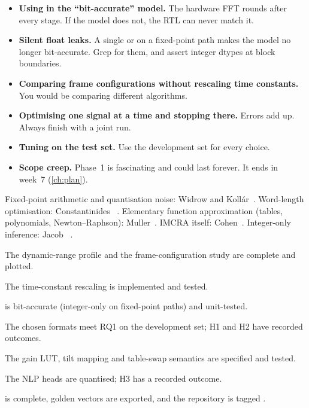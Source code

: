 \begin{pitfallbox}
\begin{itemize}
  \item \textbf{Using  in the \enquote{bit-accurate} model.} The
        hardware FFT rounds after every stage. If the model does not, the RTL
        can never match it.
  \item \textbf{Silent float leaks.} A single  or \code{/} on a
        fixed-point path makes the model no longer bit-accurate. Grep for them,
        and assert integer dtypes at block boundaries.
  \item \textbf{Comparing frame configurations without rescaling time
        constants.} You would be comparing different algorithms.
  \item \textbf{Optimising one signal at a time and stopping there.} Errors add
        up. Always finish with a joint run.
  \item \textbf{Tuning on the test set.} Use the development set for every
        choice.
  \item \textbf{Scope creep.} Phase~1 is fascinating and could last forever.
        It ends in week~7 (\cref{ch:plan}).
\end{itemize}
\end{pitfallbox}

\begin{readbox}
Fixed-point arithmetic and quantisation noise:
Widrow and Koll\'ar~\cite{widrow2008quantization}. Word-length optimisation:
Constantinides \etal~\cite{ch12-13:constantinides2003wordlength}. Elementary
function approximation (tables, polynomials, Newton--Raphson):
Muller~\cite{muller2016elementary}. IMCRA itself:
Cohen~\cite{cohen2003imcra}. Integer-only inference:
Jacob \etal~\cite{jacob2018quantization}.
\end{readbox}

\begin{donebox}
\begin{checklist}
  \item The dynamic-range profile and the frame-configuration study are complete and plotted.
  \item The time-constant rescaling is implemented and tested.
  \item {} is bit-accurate (integer-only on fixed-point paths) and unit-tested.
  \item The chosen formats meet RQ1 on the development set; H1 and H2 have recorded outcomes.
  \item The gain LUT, tilt mapping and table-swap semantics are specified and tested.
  \item The NLP heads are quantised; H3 has a recorded outcome.
  \item {} is complete, golden vectors are exported, and the repository is tagged .
\end{checklist}
\end{donebox}
